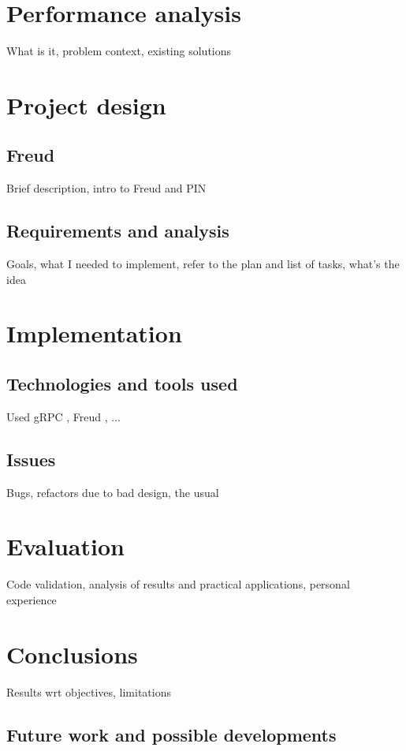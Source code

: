 \chapter{Performance analysis}

    What is it, problem context, existing solutions

\chapter{Project design}

    \section{Freud}

        Brief description, intro to Freud and PIN

    \section{Requirements and analysis}

        Goals, what I needed to implement, refer to the plan and list of tasks, what's the idea       
        

\chapter{Implementation}
    
    \section{Technologies and tools used}

        Used gRPC \cite{gRPCdocs}, Freud \cite{freud}, ...

    \section{Issues}

        Bugs, refactors due to bad design, the usual


\chapter{Evaluation}

    Code validation, analysis of results and practical applications, personal experience


\chapter{Conclusions}

    Results wrt objectives, limitations

	\section{Future work and possible developments}
